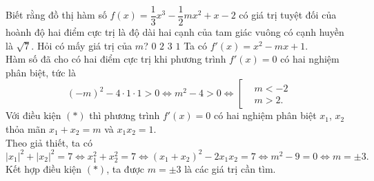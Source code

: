 \begin{ex}%
	Biết rằng đồ thị hàm số $f(x)=\dfrac{1}{3}x^3-\dfrac{1}{2}mx^2+x-2$ có giá trị tuyệt đối của hoành độ hai điểm cực trị là độ dài hai cạnh của tam giác vuông có cạnh huyền là $\sqrt{7}$. Hỏi có mấy giá trị của $m$?
	\choice
	{$0$}
	{\True $2$}
	{$3$}
	{$1$}
	\loigiai
	{
		Ta có $f'(x)=x^2-mx+1$.\\
		Hàm số đã cho có hai điểm cực trị khi phương trình $f'(x)=0$ có hai nghiệm phân biệt, tức là
		\[(-m)^2-4\cdot 1\cdot 1>0 \Leftrightarrow m^2-4>0 \Leftrightarrow \left[\begin{aligned}&m<-2 \\&m>2.\end{aligned}\right.\tag{$*$}\]
		Với điều kiện $(*)$ thì phương trình $f'(x)=0$ có hai nghiệm phân biệt $x_1$, $x_2$ thỏa mãn $x_1+x_2=m$ và $x_1x_2=1$.\\
		Theo giả thiết, ta có
		\[|x_1|^2+|x_2|^2=7 \Leftrightarrow x_1^2+x_2^2=7 \Leftrightarrow (x_1+x_2)^2-2x_1x_2=7 \Leftrightarrow m^2-9=0 \Leftrightarrow m=\pm 3.\]
		Kết hợp điều kiện $(*)$, ta được $m=\pm 3$ là các giá trị cần tìm.
	}
\end{ex}

